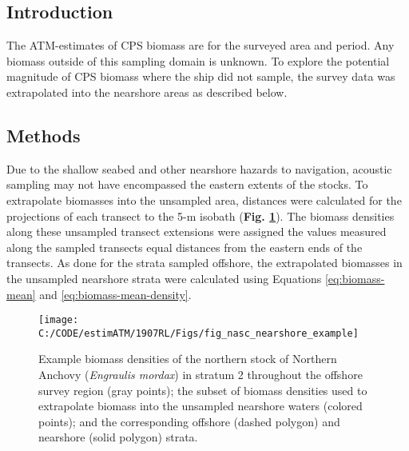 \documentclass[]{article}
\begin{document}
\hypertarget{appendix-nearshore-biomass-introduction}{%
\subsection{Introduction}\label{appendix-nearshore-biomass-introduction}}

The ATM-estimates of CPS biomass are for the surveyed area and period. Any biomass outside of this sampling domain is unknown. To explore the potential magnitude of CPS biomass where the ship did not sample, the survey data was extrapolated into the nearshore areas as described below.

\hypertarget{appendix-nearshore-biomass-methods}{%
\subsection{Methods}\label{appendix-nearshore-biomass-methods}}

Due to the shallow seabed and other nearshore hazards to navigation, acoustic sampling may not have encompassed the eastern extents of the stocks. To extrapolate biomasses into the unsampled area, distances were calculated for the projections of each transect to the 5-m isobath (\textbf{Fig. \ref{fig:nearshore-estimation}}). The biomass densities along these unsampled transect extensions were assigned the values measured along the sampled transects equal distances from the eastern ends of the transects. As done for the strata sampled offshore, the extrapolated biomasses in the unsampled nearshore strata were calculated using Equations \eqref{eq:biomass-mean} and \eqref{eq:biomass-mean-density}.



\begin{figure}[H]

{\centering \texttt{[image: C:/CODE/estimATM/1907RL/Figs/fig\_nasc\_nearshore\_example]} 

}

\caption{Example biomass densities of the northern stock of Northern Anchovy (\emph{Engraulis mordax}) in stratum 2 throughout the offshore survey region (gray points); the subset of biomass densities used to extrapolate biomass into the unsampled nearshore waters (colored points); and the corresponding offshore (dashed polygon) and nearshore (solid polygon) strata.}\label{fig:nearshore-estimation}
\end{figure}

\newpage
\end{document}
